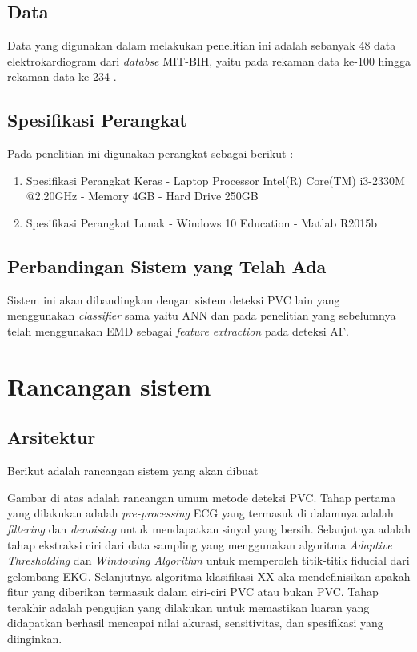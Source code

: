 \subsection{Data}
Data yang digunakan dalam melakukan penelitian ini adalah sebanyak 48 data elektrokardiogram dari \textit{databse} MIT-BIH, yaitu pada rekaman data ke-100 hingga rekaman data ke-234 \cite{mit-bih}.
	
\subsection{Spesifikasi Perangkat}
Pada penelitian ini digunakan perangkat sebagai berikut :
	\begin{enumerate}
		\item Spesifikasi Perangkat Keras
		\subitem - Laptop Processor Intel(R) Core(TM) i3-2330M @2.20GHz
		\subitem - Memory 4GB 
		\subitem - Hard Drive 250GB
		\item Spesifikasi Perangkat Lunak
		\subitem - Windows 10 Education
		\subitem - Matlab R2015b
 
	\end{enumerate} 



\subsection{Perbandingan Sistem yang Telah Ada}
Sistem ini akan dibandingkan dengan sistem deteksi PVC lain yang menggunakan \textit{classifier} sama yaitu ANN\cite{Arief2015,Sreelakshmi} dan pada penelitian yang sebelumnya telah menggunakan EMD sebagai \textit{feature extraction} pada deteksi AF\cite{UMaji}.


\section{Rancangan sistem}
\subsection{Arsitektur}
Berikut adalah rancangan sistem yang akan dibuat


Gambar di atas adalah rancangan umum metode deteksi PVC. Tahap pertama yang dilakukan adalah \textit{pre-processing} ECG yang termasuk di dalamnya adalah \textit{filtering} dan \textit{denoising} untuk mendapatkan sinyal yang bersih. Selanjutnya adalah tahap ekstraksi ciri dari data sampling yang menggunakan algoritma \textit{Adaptive Thresholding} dan \textit{Windowing Algorithm} untuk memperoleh titik-titik fiducial dari gelombang EKG. 
Selanjutnya algoritma klasifikasi XX aka mendefinisikan apakah fitur yang diberikan  termasuk dalam ciri-ciri PVC atau bukan PVC. Tahap terakhir adalah pengujian yang dilakukan untuk memastikan luaran yang didapatkan berhasil mencapai nilai akurasi, sensitivitas, dan spesifikasi yang diinginkan.

